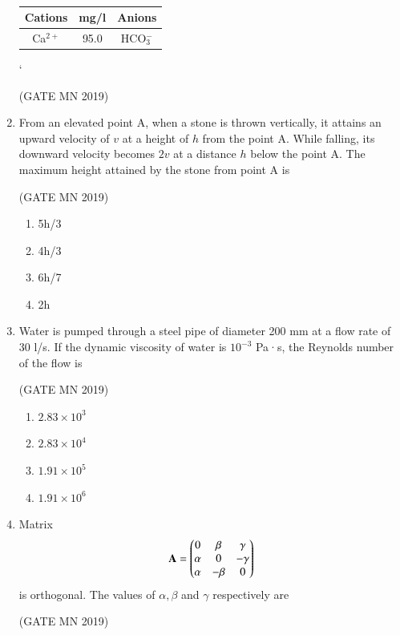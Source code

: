 \documentclass[journal]{IEEEtran}
\begin{document}
\begin{enumerate}
  \begin{table}[H]
    \centering\normalsize
  \begin{tabular}{|c|c|c|}
  \hline
  Cations & mg/l & Anions \\ \hline
  Ca$^{2+}$ & 95.0 & HCO$_3^-$ \\\hline
  \end{tabular}`
	  \caption{}
    \label{tab:Q35}
\end{table}


\hfill(GATE MN 2019)
	
\item From an elevated point A, when a stone is thrown vertically, it attains an upward velocity of $v$ at a height of $h$ from the point A. While falling, its downward velocity becomes $2v$ at a distance $h$ below the point A. The maximum height attained by the stone from point A is


	\hfill(GATE MN 2019)
\begin{multicols}{2}
\begin{enumerate}
  \item 5h/3
  \item 4h/3
  \item 6h/7
  \item 2h
\end{enumerate}
\end{multicols}


\item Water is pumped through a steel pipe of diameter 200 mm at a flow rate of 30 l/s. If the dynamic viscosity of water is $10^{-3}$ Pa·s, the Reynolds number of the flow is


	\hfill(GATE MN 2019)
\begin{multicols}{4}
\begin{enumerate}
  \item $2.83 \times 10^3$
  \item $2.83 \times 10^4$
  \item $1.91 \times 10^5$
  \item $1.91 \times 10^6$
\end{enumerate}
\end{multicols}


\item Matrix 
\[
\mathbf{A}=
\begin{pmatrix}
0 & \beta & \gamma \\
\alpha & 0 & -\gamma \\
\alpha & -\beta & 0
\end{pmatrix}
\]
is orthogonal. The values of $\alpha, \beta$ and $\gamma$ respectively are

\hfill(GATE MN 2019)


\end{enumerate}
\end{document}
